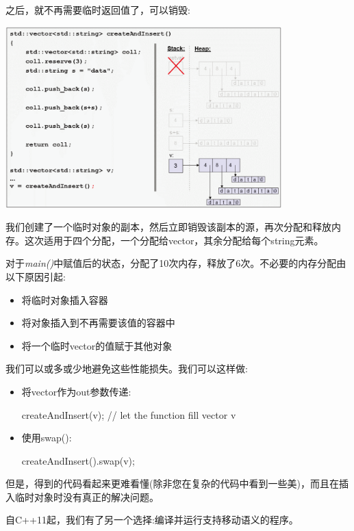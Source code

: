 \begin{itemize}
\begin{center}
	\end{center}
	之后，就不再需要临时返回值了，可以销毁:
\begin{center}
		\includegraphics[width=0.8\textwidth]{part1/ch1/images/9}
	\end{center}
	我们创建了一个临时对象的副本，然后立即销毁该副本的源，再次分配和释放内存。这次适用于四个分配，一个分配给vector，其余分配给每个string元素。
\end{itemize}

对于\textit{main()}中赋值后的状态，分配了10次内存，释放了6次。不必要的内存分配由以下原因引起:

\begin{itemize}
	\item 将临时对象插入容器
	\item 将对象插入到不再需要该值的容器中
	\item 将一个临时vector的值赋于其他对象
\end{itemize}

我们可以或多或少地避免这些性能损失。我们可以这样做:

\begin{itemize}
	\item 将vector作为out参数传递:
\begin{cppcode}
createAndInsert(v); // let the function fill vector v
\end{cppcode}
	\item 使用swap():
\begin{cppcode}
createAndInsert().swap(v);
\end{cppcode}
\end{itemize}

但是，得到的代码看起来更难看懂(除非您在复杂的代码中看到一些美)，而且在插入临时对象时没有真正的解决问题。

自C++11起，我们有了另一个选择:编译并运行支持移动语义的程序。

